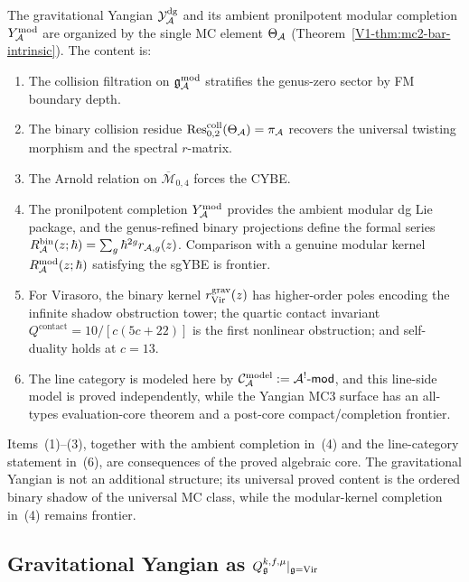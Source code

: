\begin{remark}
The gravitational Yangian
$\mathcal{Y}^{\mathrm{dg}}_{\mathcal{A}}$ and its ambient pronilpotent modular completion
$Y^{\mathrm{mod}}_{\mathcal{A}}$ are organized by the single MC element $\Theta_{\mathcal{A}}$
(Theorem~\ref*{V1-thm:mc2-bar-intrinsic}). The content is:
\begin{enumerate}[label=\textup{(\arabic*)}]
\item The collision filtration on $\mathfrak{g}_{\mathcal{A}}^{\mathrm{mod}}$ stratifies the
 genus-zero sector by FM boundary depth.
\item The binary collision residue
 $\operatorname{Res}^{\mathrm{coll}}_{0,2}(\Theta_{\mathcal{A}}) = \pi_{\mathcal{A}}$ recovers the
 universal twisting morphism and the spectral $r$-matrix.
\item The Arnold relation on $\overline{\mathcal{M}}_{0,4}$ forces
 the CYBE\@.
\item The pronilpotent completion $Y^{\mathrm{mod}}_{\mathcal{A}}$ provides the ambient
 modular dg Lie package, and the genus-refined binary projections
 define the formal series
 $R^{\mathrm{bin}}_{\mathcal{A}}(z;\hbar)=\sum_g \hbar^{2g}r_{\mathcal{A},g}(z)$.
 Comparison with a genuine modular kernel
 $R^{\mathrm{mod}}_{\mathcal{A}}(z;\hbar)$ satisfying the sgYBE is frontier.
\item For Virasoro, the binary kernel $r^{\mathrm{grav}}_{\mathrm{Vir}}(z)$ has higher-order
 poles encoding the infinite shadow obstruction tower; the quartic contact
 invariant $Q^{\mathrm{contact}} = 10/[c(5c+22)]$ is the first
 nonlinear obstruction; and self-duality holds at $c = 13$.
\item The line category is modeled here by
 $\mathcal{C}_{\mathcal{A}}^{\mathrm{model}} := \mathcal{A}^!\text{-}\mathsf{mod}$,
 and this line-side model is proved independently,
 while the Yangian MC3 surface has an all-types evaluation-core
 theorem and a post-core compact/completion frontier.
\end{enumerate}
Items~(1)--(3), together with the ambient completion in~(4) and the
line-category statement in~(6), are consequences of the proved
algebraic core. The gravitational Yangian is not an additional
structure; its universal proved content is the ordered binary shadow
of the universal MC class, while the modular-kernel completion in~(4)
remains frontier.
\end{remark}

\subsection{Gravitational Yangian as
$Q_{\mathfrak{g}}^{k,f,\mu}|_{\mathfrak{g}=\mathrm{Vir}}$}
\label{subsec:thqg-gravitational-yangian-anchor}

